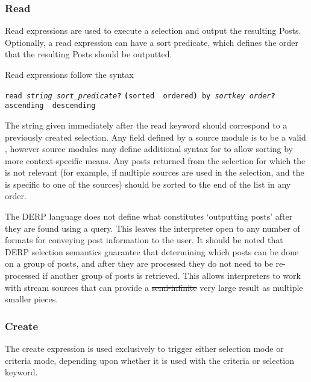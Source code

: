 \subsubsection{Read}
Read expressions are used to execute a selection and output the resulting Posts. Optionally, a read
expression can have a sort predicate, which defines the order that the resulting Posts should be outputted.

Read expressions follow the syntax
\begin{description}[labelindent=1cm,leftmargin=\onelen,labelwidth=1cm]
      \texttt{read \textit{string} \textit{sort\_predicate}\textbf{?}}
      \texttt{\textbf{(}sorted \textbf{\textbar} ordered\textbf{)} by \textit{sortkey order}\textbf{?}}
      \texttt{ascending \textbf{\textbar} descending}
\end{description}

The string given immediately after the read keyword should correspond to a previously created selection.
Any field defined by a source module is to be a valid , however source modules may define additional
syntax for  to allow sorting by more context-specific means. Any posts returned from the selection
for which the  is not relevant (for example, if multiple sources are used in the selection, and the
 is specific to one of the sources) should be sorted to the end of the list in any order.

The DERP language does not define what constitutes ‘outputting posts’ after they are found using a query.
This leaves the interpreter open to any number of formats for conveying post information to the user.
It should be noted that DERP selection semantics guarantee that determining which posts can be done on a
group of posts, and after they are processed they do not need to be re-processed if another group of posts
is retrieved. This allows interpreters to work with stream sources that can provide a \st{semi-infinite} very
large result as multiple smaller pieces.

\subsubsection{Create}
The create expression is used exclusively to trigger either selection mode or criteria mode, depending upon
whether it is used with the criteria or selection keyword.

